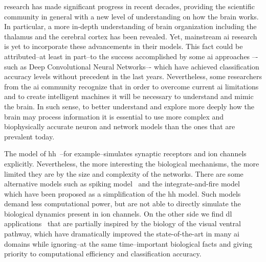 \documentclass[10pt,journal,compsoc]{IEEEtran}
\begin{document}
% 
% 
% 
% 

 

 research has made significant progress in recent decades,  providing the scientific community in general with a new level of understanding on how the brain works. In particular, a more in-depth understanding of brain organization including the thalamus and the cerebral cortex has been revealed. Yet, mainstream \gls{ai} research is yet to incorporate these advancements in their models. This fact could be attributed--at least in part--to the success accomplished by some \gls{ai} approaches –-such as Deep Convolutional Neural Networks–- which have achieved classification accuracy levels without precedent in the last years. Nevertheless, some researchers from the \gls{ai} community recognize that in order to overcome current \gls{ai} limitations and to create intelligent machines it will be necessary to understand and mimic the brain. In such sense, to better understand and explore more deeply how the brain may process information it is essential to use more complex and biophysically accurate neuron and network models than the ones that are prevalent today.

The model of \gls{hh}~\cite{HODGKIN199025}--for example--simulates synaptic receptors and ion channels explicitly. Nevertheless, the more interesting the biological mechanisms, the more limited they are by the size and complexity of the networks. There are some alternative models such as spiking model~\cite{Izhikevich2004SpiketimingDO} and the integrate-and-fire model~\cite{1333071} which have been proposed as a simplification of the \gls{hh} model. Such models demand less computational power, but are not able to directly simulate the biological dynamics present in ion channels. On the other side we find \gls{dl} applications~\cite{lecun_deep_2015} that are partially inspired by the biology of the visual ventral pathway, which have dramatically improved the state-of-the-art in many \gls{ai} domains while ignoring--at the same time--important biological facts and giving priority to computational efficiency and classification accuracy. 
\end{document}
